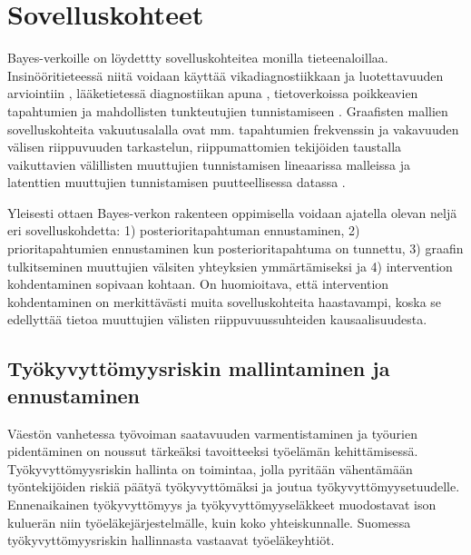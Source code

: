 \chapter{Sovelluskohteet\label{applications}}
Bayes-verkoille on löydettty sovelluskohteitea monilla tieteenaloillaa. Insinööritieteessä niitä voidaan käyttää vikadiagnostiikkaan ja luotettavuuden arviointiin \citep{zhang_brief_2019}, lääketietessä diagnostiikan apuna \citep{mittal_review_2011}, tietoverkoissa poikkeavien tapahtumien ja mahdollisten tunkteutujien tunnistamiseen \citep{kaur_review_2013}. Graafisten mallien sovelluskohteita vakuutusalalla ovat mm. tapahtumien frekvenssin ja vakavuuden välisen riippuvuuden tarkastelun, riippumattomien tekijöiden taustalla vaikuttavien välillisten muuttujien tunnistamisen lineaarissa malleissa ja latenttien muuttujien tunnistamisen puutteellisessa datassa \citep{ramsahai_connecting_2020}. 

Yleisesti ottaen Bayes-verkon rakenteen oppimisella voidaan ajatella olevan neljä eri sovelluskohdetta: 1) posterioritapahtuman ennustaminen, 2) prioritapahtumien ennustaminen kun posterioritapahtuma on tunnettu, 3) graafin tulkitseminen muuttujien välsiten yhteyksien ymmärtämiseksi ja 4) intervention kohdentaminen sopivaan kohtaan. On huomioitava, että intervention kohdentaminen on merkittävästi muita sovelluskohteita haastavampi, koska se edellyttää tietoa muuttujien välisten riippuvuussuhteiden kausaalisuudesta.

\section{Työkyvyttömyysriskin mallintaminen ja ennustaminen}

Väestön vanhetessa työvoiman saatavuuden varmentistaminen ja työurien pidentäminen on noussut tärkeäksi tavoitteeksi työelämän kehittämisessä. Työkyvyttömyysriskin hallinta on toimintaa, jolla pyritään vähentämään työntekijöiden riskiä päätyä työkyvyttömäksi ja joutua työkyvyttömyysetuudelle. Ennenaikainen työkyvyttömyys ja työkyvyttömyyseläkkeet muodostavat ison kuluerän niin työeläkejärjestelmälle, kuin koko yhteiskunnalle. Suomessa työkyvyttömyysriskin hallinnasta vastaavat työeläkeyhtiöt.

